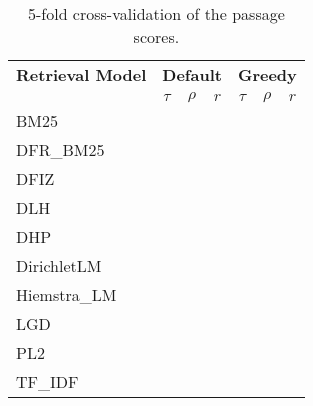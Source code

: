 \begin{table}[h!]
    \centering
    \caption{5-fold cross-validation of the passage scores.}
    \begin{tabular}{lcccccc}
        \toprule
        \textbf{Retrieval Model} & \multicolumn{3}{c}{\textbf{Default}} & \multicolumn{3}{c}{\textbf{Greedy}} \\
        \cmidrule(lr){2-4} \cmidrule(lr){5-7}
                                 & $\tau$ & $\rho$ & $r$ & $\tau$ & $\rho$ & $r$ \\
        \midrule

        BM25        & & & & & & \\
        DFR\_BM25    & & & & & & \\
        DFIZ        & & & & & & \\
        DLH         & & & & & & \\
        DHP         & & & & & & \\
        DirichletLM & & & & & & \\
        Hiemstra\_LM & & & & & & \\
        LGD         & & & & & & \\
        PL2         & & & & & & \\
        TF\_IDF      & & & & & & \\
        \bottomrule
    \end{tabular}
\end{table}